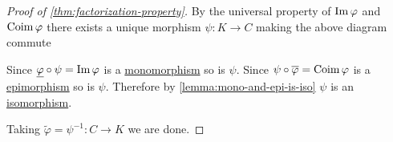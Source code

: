 \documentclass[../../../main]{subfiles}
\begin{document}
\begin{proof}[Proof of \autoref{thm:factorization-property}]
  By the universal property of \(\operatorname*{Im} \varphi\) and \(\operatorname*{Coim} \varphi\) there exists a unique morphism \(\psi: K \to C\) making the above diagram commute
  \begin{center}
  \end{center}

  Since \(\underline{\varphi} \circ \psi = \operatorname*{Im} \varphi\) is a \hyperref[def:mono-epi-morphism]{monomorphism} so is \(\psi\).
  Since \(\psi \circ \overline{\varphi} = \operatorname*{Coim} \varphi\) is a \hyperref[def:mono-epi-morphism]{epimorphism} so is \(\psi\).
  Therefore by \autoref{lemma:mono-and-epi-is-iso} \(\psi\) is an \hyperref[def:categorical-isomorphism]{isomorphism}.

  Taking \(\tilde{\varphi} = \psi^{-1}: C \to K\) we are done.
\end{proof}
\end{document}
